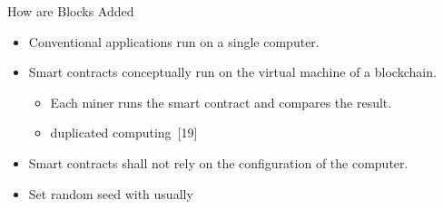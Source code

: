 \documentclass[xcolor=svgnames]{beamer}
\begin{document}
\begin{frame}{How are Blocks Added}

\begin{itemize}
\item Conventional applications run on a single computer.

\item Smart contracts conceptually run on the virtual machine of a blockchain.
	\begin{itemize}
	\item Each miner runs the smart contract and compares the result.
	\item duplicated computing~[19]
	\end{itemize}

\item Smart contracts shall not rely on the configuration of the computer.

\item Set random seed with usually 
\end{itemize}


%
%
%
%
%
\end{frame}


%
\end{document}
